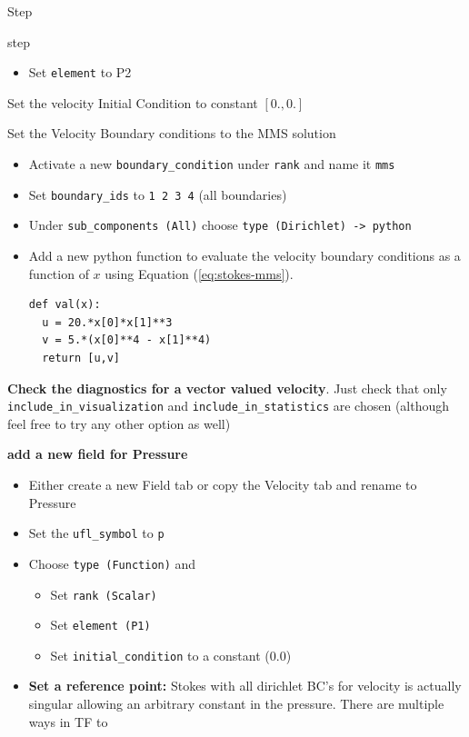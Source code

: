 \begin{steps}{Step}
\begin{steps}{step}
\begin{itemize}{}
    \item Set \texttt{element} to P2
    \end{itemize}
  \item Set the velocity Initial Condition to constant $[0.,0.]$
  \item Set the Velocity Boundary conditions to the MMS solution
    \begin{itemize}
    \item Activate a new \texttt{boundary\_condition} under
      \texttt{rank} and name it \texttt{mms}
    \item Set \texttt{boundary\_ids} to \texttt{1 2 3 4} (all boundaries)
    \item Under \texttt{sub\_components (All)} choose \texttt{type (Dirichlet)
        -> python}
    \item Add a new python function to evaluate the velocity boundary
      conditions as a function of $x$ using Equation (\ref{eq:stokes-mms}).
      \begin{lstlisting}[style=Python]
def val(x):
  u = 20.*x[0]*x[1]**3
  v = 5.*(x[0]**4 - x[1]**4)
  return [u,v]
      \end{lstlisting}
    \end{itemize}
  \item \textbf{Check the diagnostics for a vector valued
      velocity}. Just check that only
    \texttt{include\_in\_visualization} and
    \texttt{include\_in\_statistics} are chosen (although feel free to try any
    other option as well)
    \item \textbf{add a new field for Pressure}
      \begin{itemize}
      \item Either create a new Field tab or copy the Velocity tab and
        rename to Pressure
      \item Set the \texttt{ufl\_symbol} to \texttt{p}
      \item Choose \texttt{type (Function)} and
        \begin{itemize}
        \item Set \texttt{rank (Scalar)}
        \item Set \texttt{element (P1)}
        \item Set \texttt{initial\_condition} to a constant (0.0)
        \end{itemize}
      \item \textbf{Set a reference point:}  Stokes with all dirichlet
        BC's for velocity is actually singular allowing an arbitrary
        constant in the pressure.  There are multiple ways in TF to

\end{itemize}
\end{steps}
\end{steps}
